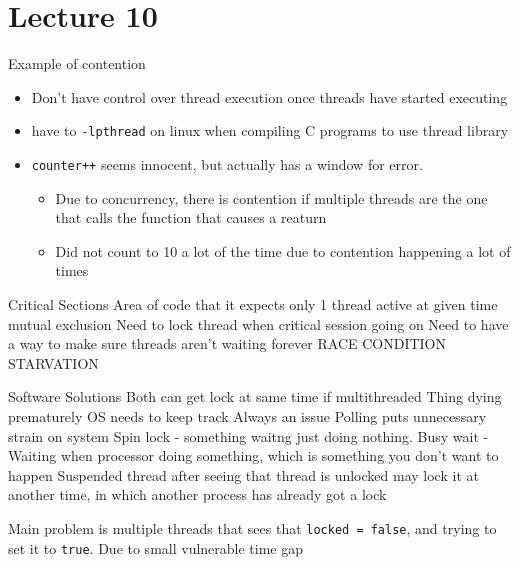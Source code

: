 \documentclass{article}
\begin{document}
\section{Lecture 10}
	Example of contention
	\begin{itemize}
		\item Don't have control over thread execution once threads have started executing
		\item have to \texttt{-lpthread} on linux when compiling C programs to use thread library
		\item \texttt{counter++} seems innocent, but actually has a window for error.
		\begin{itemize}
			\item Due to concurrency, there is contention if multiple threads are the one that calls the function that causes a reaturn
			\item Did not count to 10 a lot of the time due to contention happening a lot of times
		\end{itemize}
	\end{itemize}

	Critical Sections
		Area of code that it expects only 1 thread active at given time
		mutual exclusion
		Need to lock thread when critical session going on
		Need to have a way to make sure threads aren't waiting forever
		RACE CONDITION
		STARVATION

	Software Solutions
		Both can get lock at same time if multithreaded
		Thing dying prematurely
			OS needs to keep track
			Always an issue
		Polling	puts unnecessary strain on system
		Spin lock - something waitng just doing nothing. 
		Busy wait - Waiting when processor doing something, which is something you don't want to happen
		Suspended thread after seeing that thread is unlocked may lock it at another time, in which another process has already got a lock

		Main problem is multiple threads that sees that \texttt{locked = false}, and trying to set it to \texttt{true}. Due to small vulnerable time gap
\end{document}
